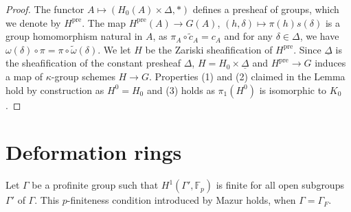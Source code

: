 \documentclass{amsart}
\theoremstyle{definition}
\theoremstyle{remark}
\newcommand{\Fp}{\mathbb F_p}
\begin{document}
\begin{proof}
    
    The functor $A\mapsto (H_0(A)\times \Delta, \ast)$ defines a presheaf of groups, which we denote by  $H^{\mathrm{pre}}$. 
    The map  $H^{\mathrm{pre}}(A) \to G(A)$, $(h, \delta)\mapsto \pi(h) s(\delta)$ is a group homomorphism natural in $A$, as $\pi_A \circ \tilde c_A = c_A$ 
    and for any $\delta \in \Delta$, we have $\omega(\delta) \circ \pi = \pi \circ \tilde \omega(\delta)$. 
    We let $H$ be the Zariski sheafification of $H^{\mathrm{pre}}$. Since $\underline{\Delta}$ is the 
    sheafification of the constant presheaf $\Delta$, 
    $H= H_0\times \underline{\Delta}$ and     $H^{\mathrm{pre}}\rightarrow G$ 
    induces a map of $\kappa$-group schemes $H\rightarrow G$. 
    Properties (1) and (2) claimed in the Lemma hold by construction as $H^0=H_0$ and (3) holds as $\pi_1(H^0)$ is isomorphic to $K_0$.
\end{proof}




\section{Deformation rings} \label{sec_def_rings}

 Let $\Gamma$ be a profinite group such  that 
 $H^1(\Gamma', \Fp)$ is finite for all open subgroups $\Gamma'$ of $\Gamma$. This $p$-finiteness 
 condition introduced by Mazur holds, when $\Gamma=\Gamma_F$. 
\end{document}

